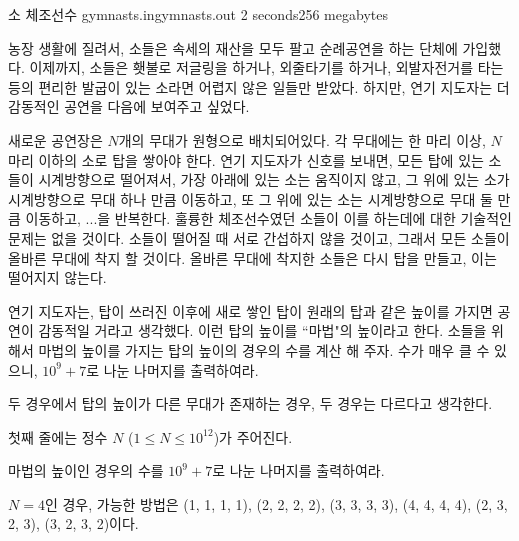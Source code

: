 \begin{problem}{소 체조선수}
	{gymnasts.in}{gymnasts.out}
	{2 seconds}{256 megabytes}{}
	
	농장 생활에 질려서, 소들은 속세의 재산을 모두 팔고 순례공연을 하는 단체에 가입했다. 이제까지, 소들은 횃불로 저글링을 하거나, 외줄타기를 하거나, 외발자전거를 타는 등의 편리한 발굽이 있는 소라면 어렵지 않은 일들만 받았다. 하지만, 연기 지도자는 더 감동적인 공연을 다음에 보여주고 싶었다.
	
	새로운 공연장은 $N$개의 무대가 원형으로 배치되어있다. 각 무대에는 한 마리 이상, $N$ 마리 이하의 소로 탑을 쌓아야 한다. 연기 지도자가 신호를 보내면, 모든 탑에 있는 소들이 시계방향으로 떨어져서, 가장 아래에 있는 소는 움직이지 않고, 그 위에 있는 소가 시계방향으로 무대 하나 만큼 이동하고, 또 그 위에 있는 소는 시계방향으로 무대 둘 만큼 이동하고, ...을 반복한다. 훌륭한 체조선수였던 소들이 이를 하는데에 대한 기술적인 문제는 없을 것이다. 소들이 떨어질 때 서로 간섭하지 않을 것이고, 그래서 모든 소들이 올바른 무대에 착지 할 것이다. 올바른 무대에 착지한 소들은 다시 탑을 만들고, 이는 떨어지지 않는다.
	
	연기 지도자는, 탑이 쓰러진 이후에 새로 쌓인 탑이 원래의 탑과 같은 높이를 가지면 공연이 감동적일 거라고 생각했다. 이런 탑의 높이를 ``마법"의  높이라고 한다. 소들을 위해서 마법의 높이를 가지는 탑의 높이의 경우의 수를 계산 해 주자. 수가 매우 클 수 있으니, $10^9+7$로 나눈 나머지를 출력하여라.
	
	두 경우에서 탑의 높이가 다른 무대가 존재하는 경우, 두 경우는 다르다고 생각한다.
	
	
	
	\InputFile
	
	첫째 줄에는 정수 $N$ ($1 \le N \le 10^12$)가 주어진다.
		
	\OutputFile
	
	마법의 높이인 경우의 수를 $10^9+7$로 나눈 나머지를 출력하여라.
	
	\Constraints
		
	\begin{example}
	\end{example}
	
	\Note
	
	$N=4$인 경우, 가능한 방법은 (1, 1, 1, 1), (2, 2, 2, 2), (3, 3, 3, 3), (4, 4, 4, 4), (2, 3, 2, 3), (3, 2, 3, 2)이다.	
	
\end{problem}

